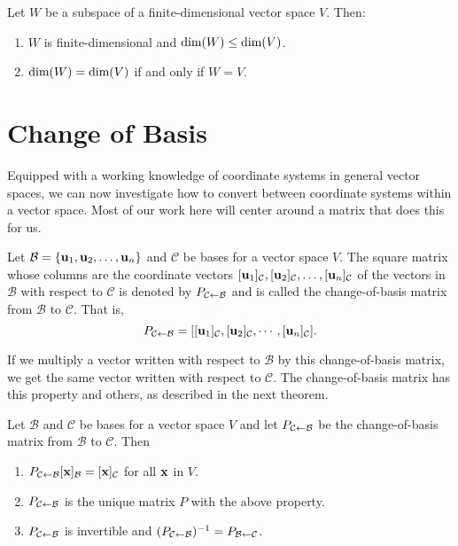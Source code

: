 \documentclass[../m73main.tex]{chapters}
\begin{document}
\begin{theorem}
	Let $W$ be a subspace of a finite-dimensional vector space $V$.
	Then:
	\begin{enumerate}[label=(\alph*)]
		\item $W$ is finite-dimensional and $\textrm{dim}(W) \leq \textrm{dim}(V)$.
		\item $\textrm{dim}(W) = \textrm{dim}(V)$ if and only if $W = V$.
	\end{enumerate}
\end{theorem}

\section{Change of Basis}
Equipped with a working knowledge of coordinate systems in general vector spaces, we can now investigate how to convert between coordinate systems within a vector space.
Most of our work here will center around a matrix that does this for us.

\begin{definition}
	Let $\mathcal{B} = \{\mathbf{u}_1, \mathbf{u}_2, \ldots, \mathbf{u}_n\}$ and $\mathcal{C}$ be bases for a vector space $V$.
	The square matrix whose columns are the coordinate vectors $[\mathbf{u}_1]_{\mathcal{C}}, [\mathbf{u}_2]_{\mathcal{C}}, \ldots, [\mathbf{u}_n]_{\mathcal{C}}$ of the vectors in $\mathcal{B}$ with respect to $\mathcal{C}$ is denoted by $P_{\mathcal{C} \leftarrow \mathcal{B}}$ and is called the change-of-basis matrix from $\mathcal{B}$ to $\mathcal{C}$.
	That is,
	\[ P_{\mathcal{C} \leftarrow \mathcal{B}} = [[\mathbf{u}_1]_{\mathcal{C}}, [\mathbf{u}_2]_{\mathcal{C}}, \cdots, [\mathbf{u}_n]_{\mathcal{C}}]. \]
\end{definition}

If we multiply a vector written with respect to $\mathcal{B}$ by this change-of-basis matrix, we get the same vector written with respect to $\mathcal{C}$.
The change-of-basis matrix has this property and others, as described in the next theorem.

\begin{theorem}
	Let $\mathcal{B}$ and $\mathcal{C}$ be bases for a vector space $V$ and let $P_{\mathcal{C} \leftarrow \mathcal{B}}$ be the change-of-basis matrix from $\mathcal{B}$ to $\mathcal{C}$.
	Then
	\begin{enumerate}[label=(\alph*)]
		\item $P_{\mathcal{C} \leftarrow \mathcal{B}}[\mathbf{x}]_{\mathcal{B}} = [\mathbf{x}]_{\mathcal{C}}$ for all $\mathbf{x}$ in $V$.
		\item $P_{\mathcal{C} \leftarrow \mathcal{B}}$ is the unique matrix $P$ with the above property.
		\item $P_{\mathcal{C} \leftarrow \mathcal{B}}$ is invertible and $(P_{\mathcal{C} \leftarrow \mathcal{B}})^{-1} = P_{\mathcal{B} \leftarrow \mathcal{C}}$.
	\end{enumerate}
\end{theorem}
\end{document}
